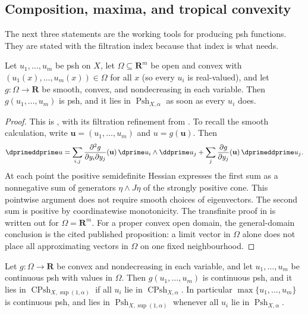 \subsection{Composition, maxima, and tropical convexity}
\label{sec:ch16-composition}

The next three statements are the working tools for producing psh
functions.  They are stated with the filtration index because that index is
what  needs.

\begin{proposition}
\label{prop:ch16-composition}
Let $u_1,\ldots,u_m$ be psh on $X$, let $\Omega\subseteq\mathbf R^m$ be open
and convex with $(u_1(x),\ldots,u_m(x))\in\Omega$ for all $x$
(so every $u_i$ is real-valued), and let
$g:\Omega\to\mathbf R$ be smooth, convex, and nondecreasing in each
variable.  Then $g(u_1,\ldots,u_m)$ is psh, and it lies in
$\operatorname{Psh}_{X,\alpha}$ as soon as every $u_i$ does.
\end{proposition}

\begin{proof}
This is , with its filtration refinement
from \cite[Proposition~8.2.1]{CLD25}.  To recall the smooth calculation,
write $\mathbf u=(u_1,\ldots,u_m)$ and $u=g(\mathbf u)$.  Then
\begin{equation}
\label{eq:ch16-composition-hessian}
 \dprimeddprime u
 =\sum_{i,j}\frac{\partial^2g}{\partial y_i\partial y_j}(\mathbf u)\,
    \dprime u_i\wedge\ddprime u_j
 +\sum_j\frac{\partial g}{\partial y_j}(\mathbf u)\,\dprimeddprime u_j .
\end{equation}
At each point the positive semidefinite Hessian expresses the first sum
as a nonnegative sum of generators $\eta\wedge J\eta$ of the strongly
positive cone.  This pointwise argument does not require smooth choices of
eigenvectors.  The second sum is positive by coordinatewise monotonicity.
The transfinite proof in  is written out for
$\Omega=\mathbf R^m$.  For a proper convex open domain, the general-domain
conclusion is the cited published proposition: a limit vector in $\Omega$
alone does not place all approximating vectors in $\Omega$ on one fixed
neighbourhood.
\end{proof}

\begin{corollary}
\label{cor:ch16-max-psh}
Let $g:\Omega\to\mathbf R$ be convex and nondecreasing in each variable, and
let $u_1,\ldots,u_m$ be continuous psh with values in $\Omega$.  Then
$g(u_1,\ldots,u_m)$ is continuous psh, and it lies in
$\operatorname{CPsh}_{X,\sup(1,\alpha)}$ if all $u_i$ lie in
$\operatorname{CPsh}_{X,\alpha}$.  In particular
$\max\{u_1,\ldots,u_m\}$ is continuous psh, and lies in
$\operatorname{Psh}_{X,\sup(1,\alpha)}$ whenever all $u_i$ lie in
$\operatorname{Psh}_{X,\alpha}$.
\end{corollary}

